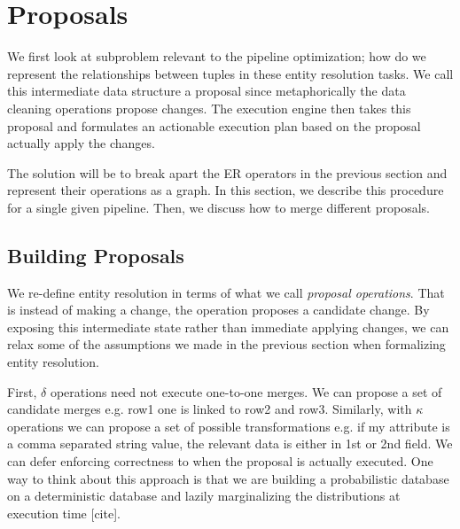 \section{Proposals}
We first look at subproblem relevant to the pipeline optimization; how do we represent the relationships 
between tuples in these entity resolution tasks.
We call this intermediate data structure a proposal since metaphorically the data cleaning operations propose changes.
The execution engine then takes this proposal and formulates an actionable execution plan based on the proposal actually apply the changes.

The solution will be to break apart the ER operators in the previous section and represent their operations
as a graph.
In this section, we describe this procedure for a single given pipeline.
Then, we discuss how to merge different proposals.

\subsection{Building Proposals}
We re-define entity resolution in terms of what we call \emph{proposal operations}.
That is instead of making a change, the operation proposes a candidate change.
By exposing this intermediate state rather than immediate applying changes, we can relax some of the assumptions we made
in the previous section when formalizing entity resolution.

First, $\delta$ operations need not execute one-to-one merges.
We can propose a set of candidate merges e.g. row1 one is linked to row2 and row3.
Similarly, with $\kappa$ operations we can propose a set of possible transformations e.g. if my attribute is a comma separated string value, the relevant data is either in 1st or 2nd field.
We can defer enforcing correctness to when the proposal is actually executed.
One way to think about this approach is that we are building a probabilistic database on a deterministic database and lazily marginalizing the distributions at execution time [cite].

